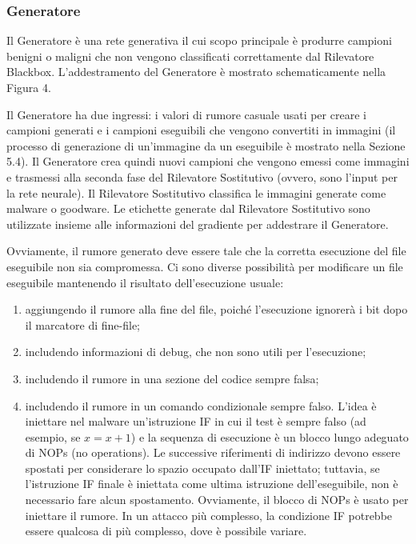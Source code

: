 \subsubsection{Generatore}
Il Generatore è una rete generativa il cui scopo principale è produrre campioni benigni o maligni che non vengono classificati correttamente dal Rilevatore Blackbox. L'addestramento del Generatore è mostrato schematicamente nella Figura 4.

Il Generatore ha due ingressi: i valori di rumore casuale usati per creare i campioni generati e i campioni eseguibili che vengono convertiti in immagini (il processo di generazione di un'immagine da un eseguibile è mostrato nella Sezione 5.4). Il Generatore crea quindi nuovi campioni che vengono emessi come immagini e trasmessi alla seconda fase del Rilevatore Sostitutivo (ovvero, sono l'input per la rete neurale). Il Rilevatore Sostitutivo classifica le immagini generate come malware o goodware. Le etichette generate dal Rilevatore Sostitutivo sono utilizzate insieme alle informazioni del gradiente per addestrare il Generatore.

Ovviamente, il rumore generato deve essere tale che la corretta esecuzione del file eseguibile non sia compromessa. Ci sono diverse possibilità per modificare un file eseguibile mantenendo il risultato dell'esecuzione usuale:

\begin{enumerate}
  \item aggiungendo il rumore alla fine del file, poiché l'esecuzione ignorerà i bit dopo il marcatore di fine-file;
  \item includendo informazioni di debug, che non sono utili per l'esecuzione;
  \item includendo il rumore in una sezione del codice sempre falsa;
  \item includendo il rumore in un comando condizionale sempre falso. L'idea è iniettare nel malware un'istruzione IF in cui il test è sempre falso (ad esempio, se \( x = x + 1 \)) e la sequenza di esecuzione è un blocco lungo adeguato di NOPs (no operations). Le successive riferimenti di indirizzo devono essere spostati per considerare lo spazio occupato dall'IF iniettato; tuttavia, se l'istruzione IF finale è iniettata come ultima istruzione dell'eseguibile, non è necessario fare alcun spostamento. Ovviamente, il blocco di NOPs è usato per iniettare il rumore. In un attacco più complesso, la condizione IF potrebbe essere qualcosa di più complesso, dove è possibile variare.
\end{enumerate}


